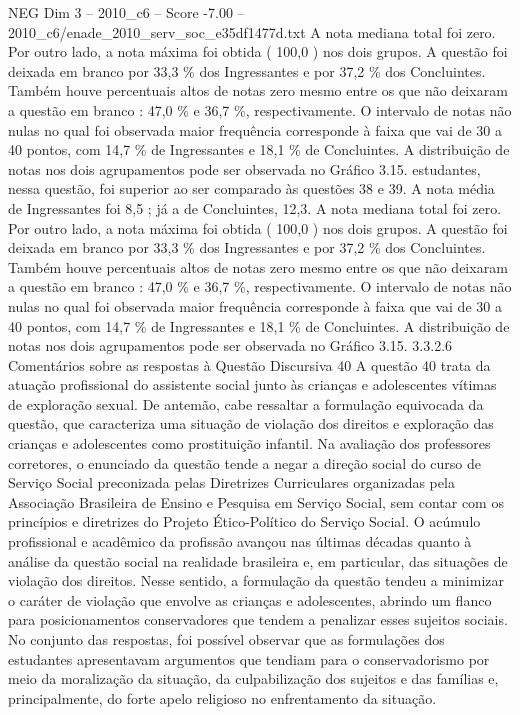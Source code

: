 \begin{textsample}{NEG Dim 3 – 2010\_c6 – Score -7.00 – 2010\_c6/enade\_2010\_serv\_soc\_e35df1477d.txt}
A nota mediana total foi zero.
Por outro lado, a nota máxima foi obtida ( 100,0 ) nos dois grupos.
A questão foi deixada em branco por 33,3 \% dos Ingressantes e por 37,2 \% dos Concluintes.
Também houve percentuais altos de notas zero mesmo entre os que não deixaram a questão em branco : 47,0 \% e 36,7 \%, respectivamente.
O intervalo de notas não nulas no qual foi observada maior frequência corresponde à faixa que vai de 30 a 40 pontos, com 14,7 \% de Ingressantes e 18,1 \% de Concluintes.
A distribuição de notas nos dois agrupamentos pode ser observada no Gráfico 3.15. estudantes, nessa questão, foi superior ao ser comparado às questões 38 e 39.
A nota média de Ingressantes foi 8,5 ; já a de Concluintes, 12,3.
A nota mediana total foi zero.
Por outro lado, a nota máxima foi obtida ( 100,0 ) nos dois grupos.
A questão foi deixada em branco por 33,3 \% dos Ingressantes e por 37,2 \% dos Concluintes.
Também houve percentuais altos de notas zero mesmo entre os que não deixaram a questão em branco : 47,0 \% e 36,7 \%, respectivamente.
O intervalo de notas não nulas no qual foi observada maior frequência corresponde à faixa que vai de 30 a 40 pontos, com 14,7 \% de Ingressantes e 18,1 \% de Concluintes.
A distribuição de notas nos dois agrupamentos pode ser observada no Gráfico 3.15. 3.3.2.6 Comentários sobre as respostas à Questão Discursiva 40 A questão 40 trata da atuação profissional do assistente social junto às crianças e adolescentes vítimas de exploração sexual.
De antemão, cabe ressaltar a formulação equivocada da questão, que caracteriza uma situação de violação dos direitos e exploração das crianças e adolescentes como prostituição infantil.
Na avaliação dos professores corretores, o enunciado da questão tende a negar a direção social do curso de Serviço Social preconizada pelas Diretrizes Curriculares organizadas pela Associação Brasileira de Ensino e Pesquisa em Serviço Social, sem contar com os princípios e diretrizes do Projeto Ético-Político do Serviço Social.
O acúmulo profissional e acadêmico da profissão avançou nas últimas décadas quanto à análise da questão social na realidade brasileira e, em particular, das situações de violação dos direitos.
Nesse sentido, a formulação da questão tendeu a minimizar o caráter de violação que envolve as crianças e adolescentes, abrindo um flanco para posicionamentos conservadores que tendem a penalizar esses sujeitos sociais.
No conjunto das respostas, foi possível observar que as formulações dos estudantes apresentavam argumentos que tendiam para o conservadorismo por meio da moralização da situação, da culpabilização dos sujeitos e das famílias e, principalmente, do forte apelo religioso no enfrentamento da situação.

\end{textsample}
